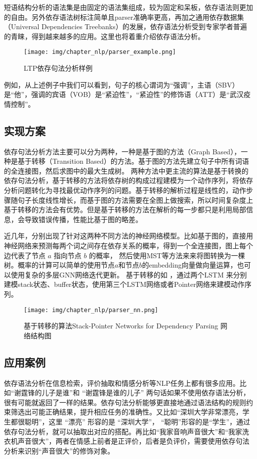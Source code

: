 短语结构分析的语法集是由固定的语法集组成，较为固定和呆板，依存语法则更加的自由。另外依存语法树标注简单且parser准确率更高，再加之通用依存数据集（Universal Dependencies Treebanks）的发展，依存语法分析受到专家学者普遍的青睐，得到越来越多的应用。这里也将着重介绍依存语法分析。

\begin{figure}[h]
\centering
\texttt{[image: img/chapter\_nlp/parser\_example.png]}
\caption{LTP依存句法分析样例}
\label{fig:parserexample}
\end{figure}
例如，从上述例子中我们可以看到，句子的核心谓词为“强调”，主语（SBV）是“他”，强调的宾语（VOB）是“紧迫性”，“紧迫性”的修饰语（ATT）是“武汉疫情控制”。


\subsection{实现方案}
依存句法分析方法主要可以分为两种，一种是基于图的方法（Graph Based），一种是基于转移（Transition Based）的方法。基于图的方法先建立句子中所有词语的全连接图，然后求图中的最大生成树。 两种方法中更主流的算法是基于转换的依存句法分析，基于转移的方法将依存树的构成过程建模为一个动作序列，将依存分析问题转化为寻找最优动作序列的问题。基于转移的解析过程是线性的，动作步骤随句子长度线性增长，而基于图的方法需要在全图上做搜索，所以时间复杂度上基于转移的方法会有优势。但是基于转移的方法在解析的每一步都只是利用局部信息，会导致错误传播，性能比基于图的略差。

近几年，分别出现了针对这两种不同方法的神经网络模型。比如基于图的\cite{dozat2016deep, ji2019graph, ma2017neural}，直接用神经网络来预测每两个词之间存在依存关系的概率，得到一个全连接图，图上每个边代表了节点 $a$ 指向节点 $b$ 的概率， 然后使用MST等方法来来将图转换为一棵树。概率的计算可以简单的使用节点$a$和节点$b$的embedding向量做向量运算，也可以使用复杂的多层GNN网络迭代更新。 基于转移的如 \cite{fernandez2019left, kiperwasser2016simple, ma2018stack}，通过两个LSTM 来分别建模stack状态、buffer状态，使用第三个LSTM网络或者Pointer网络来建模动作序列。 
\begin{figure}[h]
\centering
\texttt{[image: img/chapter\_nlp/parser\_nn.png]}
\caption{基于转移的算法Stack-Pointer Networks for Dependency Parsing 网络结构图}
\label{fig:parser_nn}
\end{figure}


\subsection{应用案例}
依存语法分析在信息检索，评价抽取和情感分析等NLP任务上都有很多应用。比如“谢霆锋的儿子是谁”和
“谢霆锋是谁的儿子” 两句话如果不使用依存语法分析，很有可能就返回了一样的结果。依存句法分析能够更直接地通过语法结构的规则约束筛选出可能正确结果，提升相应任务的准确性。又比如“深圳大学非常漂亮，学生都很聪明”，这里 “漂亮” 形容的是 “深圳大学”， “聪明”形容的是“学生”，通过依存句法分析，就可以抽取出对应的搭配。再比如“我家音响声音很大”和“我家洗衣机声音很大”，两者在情感上前者是正评价，后者是负评价，需要使用依存句法分析来识别“声音很大”的修饰对象。

